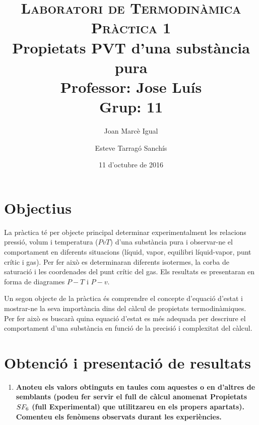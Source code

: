 \documentclass[a4paper]{article}
\title{
	\textsc{Laboratori de Termodinàmica} \\
	\textsc{Pràctica 1} \\
	Propietats PVT d'una substància pura \\
	\large
	Professor: Jose Luís \\ Grup: 11 }
\author{Joan Marcè Igual \and Esteve Tarragó Sanchís}
\date{11 d'octubre de 2016}
\begin{document}
\maketitle

\section*{Objectius}
La pràctica té per objecte principal determinar experimentalment les relacions pressió, volum i temperatura ($PvT$) d'una substància pura i observar-ne el comportament en diferents situacions (líquid, vapor, equilibri líquid-vapor, punt crític i gas). Per fer això es determinaran diferents isotermes, la corba de saturació i les coordenades del punt crític del gas. Els resultats es presentaran en forma de diagrames $P-T$ i $P-v$.

Un segon objecte de la pràctica és comprendre el concepte d’equació d’estat i mostrar-ne la seva importància dins del càlcul de propietats termodinàmiques. Per fer això es buscarà quina equació d’estat es més adequada per descriure el comportament d’una substància en funció de la precisió i complexitat del càlcul.


\section*{Obtenció i presentació de resultats}

\begin{enumerate}
	\item \textbf{Anoteu els valors obtinguts en taules com aquestes o en d’altres de semblants (podeu fer servir el full de càlcul anomenat \textbf{Propietats $\boldmath SF_6$ (full Experimental)} que utilitzareu en els propers apartats). Comenteu els fenòmens observats durant les experiències.}
\end{enumerate}
\end{document}
